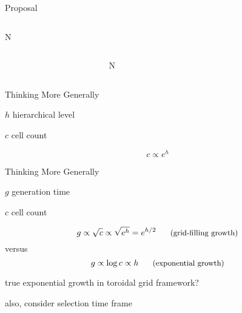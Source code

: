 \begin{frame}{Proposal}

\begin{columns}
\begin{column}{0.225\textwidth}
\raggedleft
\Huge
N
\end{column}
\begin{column}{0.225\textwidth}
\end{column}
\end{columns}

\begin{columns}
\begin{column}{0.225\textwidth}
\end{column}
\begin{column}{0.65\textwidth}
\centering
\Huge
N
\end{column}
\begin{column}{0.225\textwidth}
\end{column}
\end{columns}

\end{frame}


\begin{frame}{Thinking More Generally}

$h$ hierarchical level

$c$ cell count

{\Huge
\[
c \propto e^h
\]
}

\end{frame}

\begin{frame}{Thinking More Generally}

$g$ generation time

$c$ cell count

{\Large
\[
g \propto \sqrt{c} \propto \sqrt{e^h} = e^{h/2} \text{~~~~~\small(grid-filling growth)}
\]}
versus
{\Large
\[
g \propto \log{c} \propto h \text{~~~~~\small(exponential growth)}
\]
}

true exponential growth in toroidal grid framework?

also, consider selection time frame

\end{frame}

